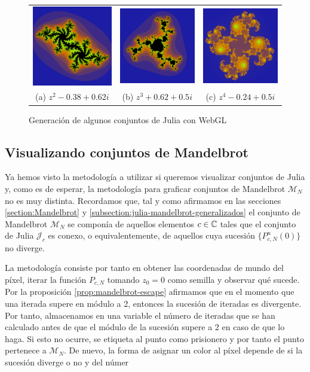 \begin{figure}[ht]
    \centering
    \begin{tabular}{ccc}
      \includegraphics[scale=0.2]{img/C6/julia-1.png} &   \includegraphics[scale=0.2]{img/C6/julia-2.png} &   \includegraphics[scale=0.2]{img/C6/julia-3.png} \\
    (a) $z^2-0.38+0.62i$ & (b) $z^3+0.62+0.5i$ & (c) $z^4-0.24+0.5i$ \\[6pt]
    \end{tabular}
    \caption{Generación de algunos conjuntos de Julia con WebGL}
    \label{fig:julia-webgl}
\end{figure}

\subsection{Visualizando conjuntos de Mandelbrot}

Ya hemos visto la metodología a utilizar si queremos visualizar conjuntos de Julia y, como es de esperar, la metodología para graficar conjuntos de Mandelbrot $\mathcal{M}_N$ no es muy distinta. Recordamos que, tal y como afirmamos en las secciones \ref{section:Mandelbrot} y \ref{subsection:julia-mandelbrot-generalizados} el conjunto de Mandelbrot $\mathcal{M}_N$ se componía de aquellos elementos $c\in\mathbb{C}$ tales que el conjunto de Julia $\mathcal{J}_c$ es conexo, o equivalentemente, de aquellos cuya sucesión $\{P_{c,N}^n(0)\}$ no diverge.

La metodología consiste por tanto en obtener las coordenadas de mundo del píxel, iterar la función $P_{c,N}$ tomando $z_0=0$ como semilla y observar qué sucede. Por la proposición \ref{prop:mandelbrot-escape} afirmamos que en el momento que una iterada supere en módulo a 2, entonces la sucesión de iteradas es divergente. Por tanto, almacenamos en una variable el número de iteradas que se han calculado antes de que el módulo de la sucesión supere a 2 en caso de que lo haga. Si esto no ocurre, se etiqueta al punto como prisionero y por tanto el punto pertenece a $\mathcal{M}_N$. De nuevo, la forma de asignar un color al píxel depende de si la sucesión diverge o no y del númer